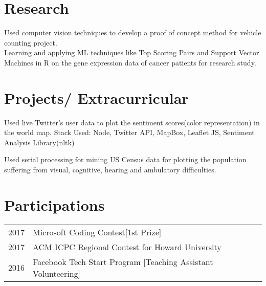 \documentclass[]{deedy-resume-openfont}
\begin{document}
\begin{minipage}[t]{0.66\textwidth}

\section{Research}
Used computer vision techniques to develop a proof of concept method for vehicle counting project. \\
\sectionsep
{}
Learning and applying ML techniques like Top Scoring Pairs and Support Vector Machines in R on the gene
expression data of cancer patients for research study.
\sectionsep


\section{Projects/ Extracurricular}
 Used live Twitter's user data to plot the sentiment scores(color representation) in the world map. Stack Used: Node, Twitter API, MapBox, Leaflet JS, Sentiment Analysis Library(nltk) 
\sectionsep

Used serial processing for mining US Census data for plotting the population suffering from visual, cognitive, hearing and ambulatory difficulties.
\sectionsep


\section{Participations} 
\begin{tabular}{rll}
2017	     &Microsoft Coding Contest[1st Prize] \\
2017	     & ACM ICPC Regional Contest for Howard University \\
2016	     & Facebook Tech Start Program [Teaching Assistant Volunteering]\\
\end{tabular}
\sectionsep


\end{minipage} 
\end{document}
